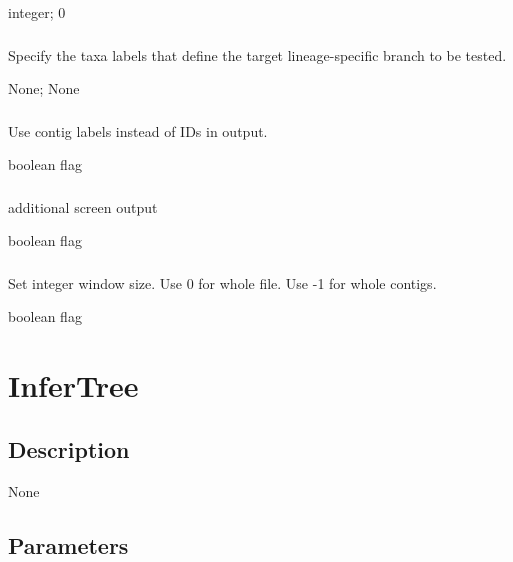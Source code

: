 \documentclass[letterpaper,11pt,english]{sphinxmanual}
\begin{document}
 integer;  0


\subsubsection{}
\label{\detokenize{prog_desc:target}}
 Specify the taxa labels that define the target lineage-specific branch to be tested.

 None;  None


\subsubsection{}
\label{\detokenize{prog_desc:use-labels-uselabels}}
 Use contig labels instead of IDs in output.

 boolean flag


\subsubsection{}
\label{\detokenize{prog_desc:id114}}
 additional screen output

 boolean flag


\subsubsection{}
\label{\detokenize{prog_desc:id115}}
 Set integer window size. Use 0 for whole file. Use -1 for whole contigs.

 boolean flag


\section{InferTree}
\label{\detokenize{prog_desc:infertree}}

\subsection{Description}
\label{\detokenize{prog_desc:id116}}
None


\subsection{Parameters}
\label{\detokenize{prog_desc:id117}}
\end{document}
